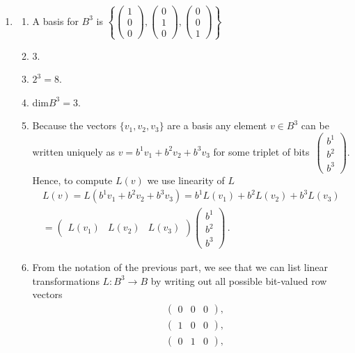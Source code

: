 \begin{enumerate}
\item 
\begin{enumerate}
\item A basis for $B^3$ is $\left\{
\begin{pmatrix}1\\0\\0\end{pmatrix},
\begin{pmatrix}0\\1\\0\end{pmatrix},
\begin{pmatrix}0\\0\\1\end{pmatrix}
\right\}$
\item 3.
\item $2^3=8$.
\item dim$B^3=3$.
\item Because the vectors $\{v_1,v_2,v_3\}$ are a basis any element $v\in B^3$ can be
written uniquely as $v=b^1 v_1 +b^2 v_2+b^3 v_3$ for some triplet of bits~$\begin{pmatrix}b^1\\b^2\\b^3\end{pmatrix}$. Hence, to compute $L(v)$ we use linearity of $L$
\begin{gather*}
L(v) = L(b^1 v_1 +b^2 v_2+b^3 v_3) = b^1 L(v_1)  + b^2 L(v_2) + b^3 L(v_3) \\= \begin{pmatrix}L(v_1) & L(v_2) & L(v_3)\end{pmatrix}
\begin{pmatrix}b^1\\b^2\\b^3\end{pmatrix}\, .
\end{gather*}
\item From the notation of the previous part, we see that we can list  linear transformations $L:B^3\to B$
by writing out all possible bit-valued row vectors
\begin{align*}
&\begin{pmatrix}0 & 0 & 0\end{pmatrix} ,\\
&\begin{pmatrix}1 & 0 & 0\end{pmatrix} ,\\
&\begin{pmatrix}0 & 1 & 0\end{pmatrix} ,\\

\end{align*}
\end{enumerate}
\end{enumerate}
